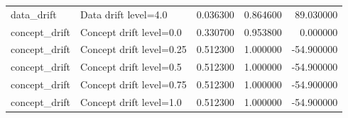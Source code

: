 \begin{table}
\begin{tabular}{llrrr}
data_drift & Data drift level=4.0 & 0.036300 & 0.864600 & 89.030000 \\
concept_drift & Concept drift level=0.0 & 0.330700 & 0.953800 & 0.000000 \\
concept_drift & Concept drift level=0.25 & 0.512300 & 1.000000 & -54.900000 \\
concept_drift & Concept drift level=0.5 & 0.512300 & 1.000000 & -54.900000 \\
concept_drift & Concept drift level=0.75 & 0.512300 & 1.000000 & -54.900000 \\
concept_drift & Concept drift level=1.0 & 0.512300 & 1.000000 & -54.900000 \\
\bottomrule
\end{tabular}
\end{table}
